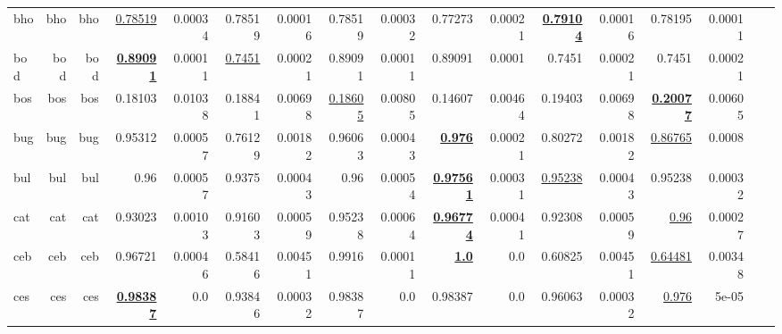 \documentclass[11pt]{article}
\begin{document}
\begin{table*}[h]
{\begin{tabular}{lrrrrrrrrrrrrrrrr}
bho         & bho         & bho         & \underline{0.78519}         & 0.00034         & 0.78519         & 0.00016         & 0.78519         & 0.00032         & 0.77273         & 0.00021         & \textbf{\underline{0.79104}}         & 0.00016         & 0.78195         & 0.00011         \\
bod         & bod         & bod         & \textbf{\underline{0.89091}}         & 0.00011         & \underline{0.7451}         & 0.00021         & 0.89091         & 0.00011         & 0.89091         & 0.0001         & 0.7451         & 0.00021         & 0.7451         & 0.00021         \\
bos         & bos         & bos         & 0.18103         & 0.01038         & 0.18841         & 0.00698         & \underline{0.18605}         & 0.00805         & 0.14607         & 0.00464         & 0.19403         & 0.00698         & \textbf{\underline{0.20077}}         & 0.00605         \\
bug         & bug         & bug         & 0.95312         & 0.00057         & 0.76129         & 0.00182         & 0.96063         & 0.00043         & \textbf{\underline{0.976}}         & 0.00021         & 0.80272         & 0.00182         & \underline{0.86765}         & 0.0008         \\
bul         & bul         & bul         & 0.96         & 0.00057         & 0.9375         & 0.00043         & 0.96         & 0.00054         & \textbf{\underline{0.97561}}         & 0.00031         & \underline{0.95238}         & 0.00043         & 0.95238         & 0.00032         \\
cat         & cat         & cat         & 0.93023         & 0.00103         & 0.91603         & 0.00059         & 0.95238         & 0.00064         & \textbf{\underline{0.96774}}         & 0.00041         & 0.92308         & 0.00059         & \underline{0.96}         & 0.00027         \\
ceb         & ceb         & ceb         & 0.96721         & 0.00046         & 0.58416         & 0.00451         & 0.9916         & 0.00011         & \textbf{\underline{1.0}}         & 0.0         & 0.60825         & 0.00451         & \underline{0.64481}         & 0.00348         \\
ces         & ces         & ces         & \textbf{\underline{0.98387}}         & 0.0         & 0.93846         & 0.00032         & 0.98387         & 0.0         & 0.98387         & 0.0         & 0.96063         & 0.00032         & \underline{0.976}         & 5e-05         \\

\end{tabular}}
\end{table*}
\end{document}
